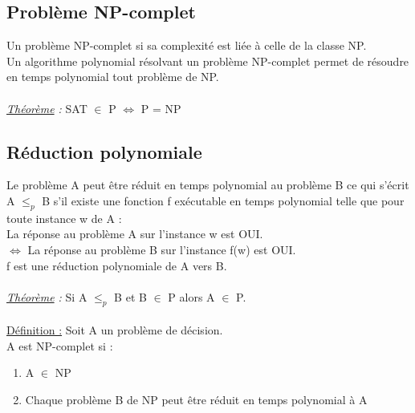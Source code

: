 \documentclass[12pt,a4paper]{article}
\newcommand\tab[1][0.65cm]{\hspace*{#1}}
\begin{document}
\subsection{Problème NP-complet}
Un problème NP-complet si sa complexité est liée à celle de la classe NP.\\
Un algorithme polynomial résolvant un problème NP-complet permet de résoudre en temps polynomial tout problème de NP.\\\\
\textit{\underline{Théorème} :} SAT $\in$ P $\Leftrightarrow$ P = NP
\subsection{Réduction polynomiale}
Le problème A peut être réduit en temps polynomial au problème B ce qui s'écrit A $\leq_p$ B s'il existe une fonction f exécutable en temps polynomial telle que pour toute instance w de A :\\
\tab La réponse au problème A sur l'instance w est OUI.\\
$\Leftrightarrow$ La réponse au problème B sur l'instance f(w) est OUI.\\
f est une réduction polynomiale de A vers B.\\\\
\textit{\underline{Théorème} :} Si  A $\leq_p$ B et B $\in$ P alors A $\in$ P.\\\\
\underline{Définition :} Soit A un problème de décision.\\
\tab A est NP-complet si :
\begin{enumerate}
	
	\item A $\in$ NP
	\item Chaque problème B de NP peut être réduit en temps polynomial à A
\end{enumerate}
\end{document}
